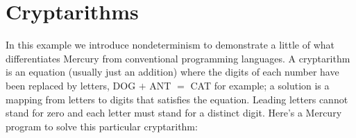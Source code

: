 \documentclass[a4paper,11pt,notitlepage,onecolumn]{book}
\begin{document}
\newpage




\section{Cryptarithms}

In this example we introduce nondeterminism to demonstrate a
little of what differentiates Mercury from conventional programming
languages.  A cryptarithm is an
equation (usually just an addition) where the digits of each number have
been replaced by letters, \textsf{DOG {\ensuremath{+}} ANT {\ensuremath{=}} CAT} for example; a solution is a
mapping from letters to digits that satisfies the equation.  Leading letters
cannot stand for zero and each letter must stand for a distinct digit.
Here's a Mercury program to solve this particular cryptarithm:
\end{document}
